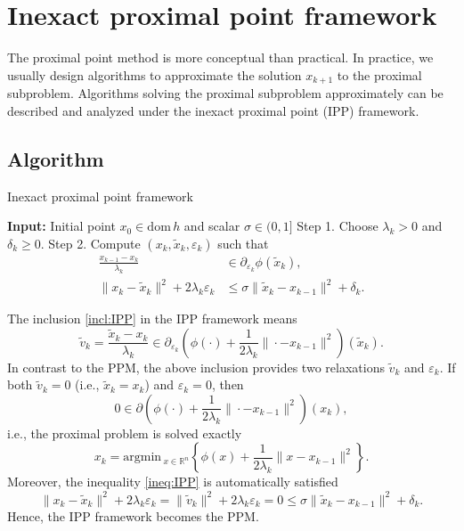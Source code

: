 \documentclass[11pt]{article}
\newcommand{\R}{\mathbb{R}}
\newcommand{\argmin}{\mathrm{argmin}\,}
\newcommand{\dom}{\mathrm{dom}\,}
\newcommand{\tx}{\tilde x}
\begin{document}
\section{Inexact proximal point framework}

The proximal point method is more conceptual than practical. In practice, we usually design algorithms to approximate the solution $ x_{k+1} $ to the proximal subproblem. Algorithms solving the proximal subproblem approximately can be described and analyzed under the inexact proximal point (IPP) framework.

\subsection{Algorithm}

\begin{algorithm}[H]
	\caption{Inexact proximal point framework}
	\begin{algorithmic}\label{algo:algo2}
		\STATE \textbf{Input:} Initial point $x_0\in \dom h$ and scalar $\sigma\in (0,1]$
		\STATE Step 1. Choose $\lambda_k>0$ and $\delta_k\ge 0$. 
		\STATE Step 2. Compute $(x_k,\tx_k, \varepsilon_k)$ such that
		\begin{align}
			\frac{x_{k-1} - x_k}{\lambda_k} &\in \partial_{\varepsilon_k} \phi(\tx_k), \label{incl:IPP}\\
			\|x_k-\tx_k\|^2 + 2\lambda_k \varepsilon_k &\le \sigma \|\tx_k - x_{k-1}\|^2 + \delta_k. \label{ineq:IPP}
		\end{align}
		\ENDFOR
	\end{algorithmic}
\end{algorithm}


The inclusion \eqref{incl:IPP} in the IPP framework means
\[
\tilde v_k = \frac{\tx_k - x_k}{\lambda_k} \in \partial_{\varepsilon_k} \left(\phi(\cdot) + \frac{1}{2\lambda_k}\|\cdot - x_{k-1}\|^2\right)(\tx_k).
\]
In contrast to the PPM, the above inclusion provides two relaxations $ \tilde v_k$ and $ \varepsilon_k $. If both $\tilde v_k=0$ (i.e., $ \tx_k=x_k $) and $\varepsilon_k=0$, then
\[
0 \in \partial \left(\phi(\cdot) + \frac{1}{2\lambda_k}\|\cdot - x_{k-1}\|^2\right)(x_k),
\]
i.e., the proximal problem is solved exactly
\[
x_k = \argmin_{x\in \R^n} \left\{ \phi(x) + \frac1{2\lambda_k} \|x-x_{k-1}\|^2 \right\}.
\]
Moreover, the inequality \eqref{ineq:IPP} is automatically satisfied
\[
\|x_k-\tx_k\|^2 + 2\lambda_k \varepsilon_k = \|\tilde v_k\|^2 + 2\lambda_k \varepsilon_k  = 0 \le \sigma \|\tx_k - x_{k-1}\|^2 + \delta_k.
\]
Hence, the IPP framework becomes the PPM.
\end{document}
